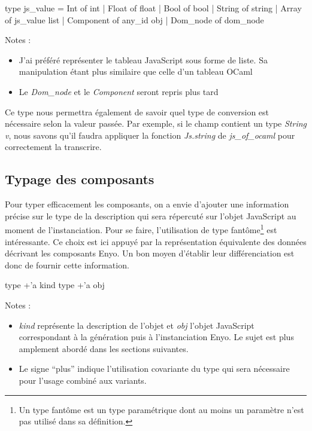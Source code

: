 \documentclass[11pt,a4paper]{report}
\begin{document}
\begin{OCaml}
  type js_value = Int of int | Float of float
                | Bool of bool | String of string
                | Array of js_value list 
                | Component of any_id obj | Dom_node of dom_node
\end{OCaml}

Notes : 
\begin{itemize}
\item J'ai préféré représenter le tableau JavaScript sous forme de liste. Sa manipulation étant 
  plus similaire que celle d'un tableau OCaml
\item Le \emph{Dom\_node} et le \emph{Component} seront repris plus tard 
\end{itemize}

Ce type nous permettra également de savoir quel type de conversion est nécessaire selon 
la valeur passée.
Par exemple, si le champ contient un type \emph{String v}, nous savons qu'il faudra appliquer
la fonction \emph{Js.string} de \emph{js\_of\_ocaml} pour correctement la transcrire.

\subsection{Typage des composants}

Pour typer efficacement les composants, on a envie d'ajouter une information précise sur le type
de la description qui sera répercuté sur l'objet JavaScript au moment de l'instanciation. Pour se faire,
l'utilisation de type fantôme\footnote{Un type fantôme est un type paramétrique dont au moins un paramètre 
n'est pas utilisé dans sa définition.} est intéressante. Ce choix est ici appuyé par la représentation équivalente 
des données décrivant les composants Enyo. Un bon moyen d'établir leur différenciation est donc de fournir
cette information.

\begin{OCaml}
  type +'a kind
  type +'a obj
\end{OCaml}

Notes : 
\begin{itemize}
\item \emph{kind} représente la description de l'objet et \emph{obj} l'objet JavaScript correspondant
  à la génération puis à l'instanciation Enyo. Le sujet est plus amplement abordé dans les sections
  suivantes.
\item Le signe ``plus'' indique l'utilisation covariante du type qui sera nécessaire pour l'usage
  combiné aux variants.
\end{itemize}
\end{document}
